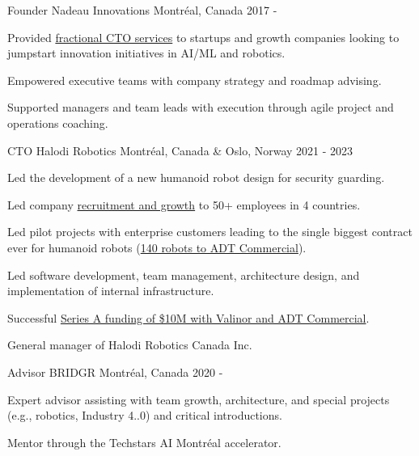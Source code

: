 \begin{cventries}

    \cventry
    {Founder}
    {Nadeau Innovations}
    {Montréal, Canada}
    {2017 - }
    {
        \begin{cvitems}
            \item{Provided \href{https://nadeauinnovations.com/}{fractional CTO services} to startups and growth companies looking to jumpstart innovation initiatives in AI/ML and robotics.}
            \item{Empowered executive teams with company strategy and roadmap advising.}
            \item{Supported managers and team leads with execution through agile project and operations coaching.}
        \end{cvitems}
    }

    \cventry
    {CTO}
    {Halodi Robotics}
    {Montréal, Canada \& Oslo, Norway}
    {2021 - 2023}
    {
        \begin{cvitems}
            \item{Led the development of a new humanoid robot design for security guarding.}
            \item{Led company \href{https://www.nicholasnadeau.com/talk/society-robots-and-us-hiring-for-inclusive-robotics/}{recruitment and growth} to 50+ employees in 4 countries.}
            \item{Led pilot projects with enterprise customers leading to the single biggest contract ever for humanoid robots (\href{https://www.halodi.com/press-releases/halodi-robotics-inks-contract-with-adt-commercial-for-delivery-of-140-humanoid-robots}{140 robots to ADT Commercial}).}
            \item{Led software development, team management, architecture design, and implementation of internal infrastructure.}
            \item{Successful \href{https://www.halodi.com/press-releases/adt-invests-in-and-partners-with-halodi-robotics-lbz49}{Series A funding of \$10M with Valinor and ADT Commercial}.}
            \item{General manager of Halodi Robotics Canada Inc.}
        \end{cvitems}
    }

    \cventry
    {Advisor}
    {BRIDGR}
    {Montréal, Canada}
    {2020 - }
    {
        \begin{cvitems}
            \item{Expert advisor assisting with team growth, architecture, and special projects (e.g., robotics, Industry 4..0) and critical introductions.}
            \item{Mentor through the Techstars AI Montréal accelerator.}
        \end{cvitems}
    }


\end{cventries}

